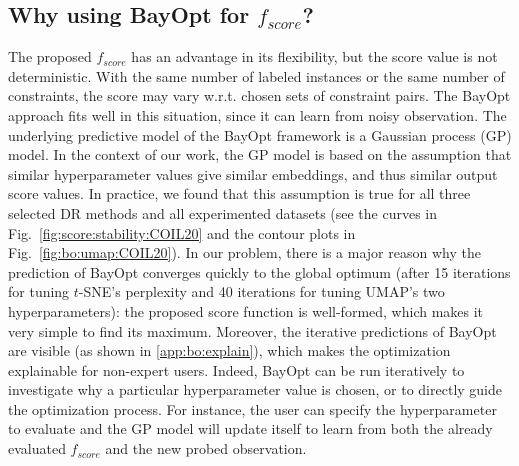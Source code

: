 \subsection{Why using BayOpt for $f_{score}$?}
The proposed $f_{score}$ has an advantage in its flexibility, but the score value is not deterministic.
With the same number of labeled instances or the same number of constraints, the score may vary w.r.t. chosen sets of constraint pairs.
The BayOpt approach fits well in this situation, since it can learn from noisy observation.
The underlying predictive model of the BayOpt framework is a Gaussian process (GP) model.
In the context of our work, the GP model is based on the assumption that similar hyperparameter values give similar embeddings, and thus similar output score values.
In practice, we found that this assumption is true for all three selected DR methods and all experimented datasets (see the curves in Fig.~\ref{fig:score:stability:COIL20} and the contour plots in Fig.~\ref{fig:bo:umap:COIL20}).
In our problem, there is a major reason why the prediction of BayOpt converges quickly to the global optimum (after 15 iterations for tuning $t$-SNE's perplexity and 40 iterations for tuning UMAP's two hyperparameters): the proposed score function is well-formed, which makes it very simple to find its maximum.
Moreover, the iterative predictions of BayOpt are visible (as shown in \ref{app:bo:explain}), which makes the optimization explainable for non-expert users.
Indeed, BayOpt can be run iteratively to investigate why a particular hyperparameter value is chosen, or to directly guide the optimization process. For instance, the user can specify the hyperparameter to evaluate and the GP model will update itself to learn from both the already evaluated $f_{score}$ and the new probed observation.

